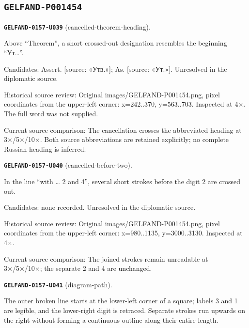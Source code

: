 \subsection*{\texttt{GELFAND-P001454}}
\par\noindent\leavevmode{}\label{GELFAND-0157-U039}\label{GELFAND-P001454:cancelled-theorem-heading}\textbf{\texttt{GELFAND-0157-U039}} (cancelled-theorem-heading).\nopagebreak[4]\par
Above “Theorem”, a short crossed-out designation resembles the beginning “Ут…”.\par
Candidates: Assert. [source: «Утв.»]; As. [source: «Ут.»]. Unresolved in the diplomatic source.\par
Historical source review: Original images/GELFAND-P001454.png, pixel coordinates from the upper-left corner: x=242..370, y=563..703. Inspected at 4×. The full word was not supplied.\par
Current source comparison: The cancellation crosses the abbreviated heading at 3×/5×/10×. Both source abbreviations are retained explicitly; no complete Russian heading is inferred.\par\medskip
\par\noindent\leavevmode{}\label{GELFAND-0157-U040}\label{GELFAND-P001454:cancelled-before-two}\textbf{\texttt{GELFAND-0157-U040}} (cancelled-before-two).\nopagebreak[4]\par
In the line “with … 2 and 4”, several short strokes before the digit 2 are crossed out.\par
Candidates: none recorded. Unresolved in the diplomatic source.\par
Historical source review: Original images/GELFAND-P001454.png, pixel coordinates from the upper-left corner: x=980..1135, y=3000..3130. Inspected at 4×.\par
Current source comparison: The joined strokes remain unreadable at 3×/5×/10×; the separate 2 and 4 are unchanged.\par\medskip
\par\noindent\leavevmode{}\label{GELFAND-0157-U041}\label{GELFAND-P001454:diagram-path}\textbf{\texttt{GELFAND-0157-U041}} (diagram-path).\nopagebreak[4]\par
The outer broken line starts at the lower-left corner of a square; labels 3 and 1 are legible, and the lower-right digit is retraced. Separate strokes run upwards on the right without forming a continuous outline along their entire length.\par
